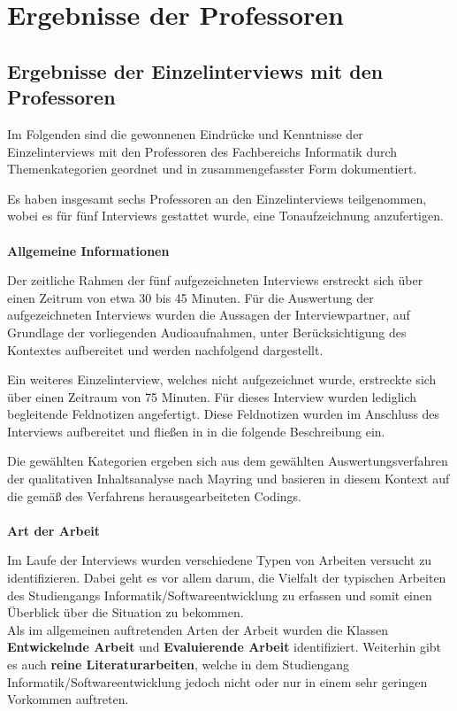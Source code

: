 \documentclass{scrreprt}
\begin{document}
\section{Ergebnisse der Professoren}
\subsection{Ergebnisse der Einzelinterviews mit den Professoren}
\par Im Folgenden sind die gewonnenen Eindrücke und Kenntnisse der Einzelinterviews mit den Professoren des Fachbereichs Informatik durch Themenkategorien geordnet und in zusammengefasster Form dokumentiert. \\
\par Es haben insgesamt sechs Professoren an den Einzelinterviews teilgenommen, wobei es für fünf Interviews gestattet wurde, eine Tonaufzeichnung anzufertigen.\\\\
\textbf{Allgemeine Informationen}\\
\par Der zeitliche Rahmen der fünf aufgezeichneten Interviews erstreckt sich über einen Zeitrum von etwa 30 bis 45 Minuten. Für die Auswertung der aufgezeichneten Interviews wurden die Aussagen der Interviewpartner, auf Grundlage der vorliegenden Audioaufnahmen, unter Berücksichtigung des Kontextes aufbereitet und werden nachfolgend dargestellt.\\
\par Ein weiteres Einzelinterview, welches nicht aufgezeichnet wurde, erstreckte sich über einen Zeitraum von 75 Minuten. Für dieses Interview wurden lediglich begleitende Feldnotizen angefertigt. Diese Feldnotizen wurden im Anschluss des Interviews aufbereitet und fließen in in die folgende Beschreibung ein.\\
\par Die gewählten Kategorien ergeben sich aus dem gewählten Auswertungsverfahren der qualitativen Inhaltsanalyse nach Mayring\cite{Mayring2015} und basieren in diesem Kontext auf die gemäß des Verfahrens herausgearbeiteten Codings.\\\\


\textbf{Art der Arbeit}\\
\par Im Laufe der Interviews wurden verschiedene Typen von Arbeiten versucht zu identifizieren. Dabei geht es vor allem darum, die Vielfalt der typischen Arbeiten des Studiengangs Informatik/Softwareentwicklung zu erfassen und somit einen Überblick über die Situation zu bekommen.\\
Als im allgemeinen auftretenden Arten der Arbeit wurden die Klassen \textbf{Entwickelnde Arbeit}  und \textbf{Evaluierende Arbeit} identifiziert. Weiterhin gibt es auch \textbf{reine Literaturarbeiten}, welche in dem Studiengang Informatik/Softwareentwicklung jedoch nicht oder nur in einem sehr geringen Vorkommen auftreten.\\
\end{document}
